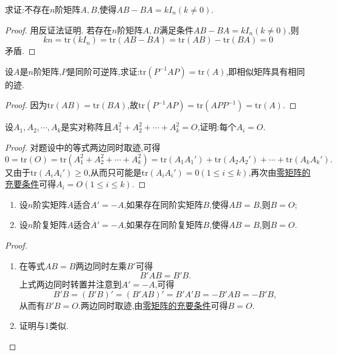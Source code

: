 \documentclass[../../main.tex]{subfiles}
\begin{document}
\begin{example}
求证:不存在\(n\)阶矩阵\(A,B\),使得\(AB - BA = kI_n(k\neq0)\).
\end{example}
\begin{proof}
用反证法证明. 若存在\(n\)阶矩阵\(A,B\)满足条件\(AB - BA = kI_n(k\neq0)\),则
\[
kn=\mathrm{tr}(kI_n)=\mathrm{tr}(AB - BA)=\mathrm{tr}(AB)-\mathrm{tr}(BA)=0
\]
矛盾.
\end{proof}

\begin{proposition}
设\(A\)是\(n\)阶矩阵,\(P\)是同阶可逆阵,求证:\(\mathrm{tr}(P^{-1}AP)=\mathrm{tr}(A)\),即相似矩阵具有相同的迹.
\end{proposition}
\begin{proof}
因为\(\mathrm{tr}(AB)=\mathrm{tr}(BA)\),故\(\mathrm{tr}(P^{-1}AP)=\mathrm{tr}(APP^{-1})=\mathrm{tr}(A)\).
\end{proof}

\begin{example}
设\(A_1,A_2,\cdots,A_k\)是实对称阵且\(A_1^2 + A_2^2+\cdots+A_k^2 = O\),证明:每个\(A_i = O\).
\end{example}
\begin{proof}
对题设中的等式两边同时取迹,可得
\[
0=\mathrm{tr}(O)=\mathrm{tr}(A_1^2 + A_2^2+\cdots+A_k^2)=\mathrm{tr}(A_1A_1')+\mathrm{tr}(A_2A_2')+\cdots+\mathrm{tr}(A_kA_k').
\]
又由于\(\mathrm{tr}(A_iA_i')\geqslant 0\),从而只可能是\(\mathrm{tr}(A_iA_i') = 0(1\leqslant  i\leqslant  k)\),再次由\hyperref[proposition:零矩阵的充要条件]{零矩阵的充要条件}可得\(A_i = O(1\leqslant  i\leqslant  k)\).
\end{proof}

\begin{proposition}\label{proposition:反称/反酉矩阵为零矩阵的充要条件}
\begin{enumerate}
\item 设\(n\)阶实矩阵\(A\)适合\(A'=-A\),如果存在同阶实矩阵\(B\),使得\(AB = B\),则\(B = O\);
\item 设\(n\)阶复矩阵\(A\)适合\(\overline{A}'=-A\),如果存在同阶复矩阵\(B\),使得\(AB = B\),则\(B = O\).
\end{enumerate}
\end{proposition}
\begin{proof}
\begin{enumerate}
\item 在等式\(AB = B\)两边同时左乘\(B'\)可得
\[
B'AB = B'B.
\]
上式两边同时转置并注意到\(A'=-A\),可得
\[
B'B=(B'B)'=(B'AB)'=B'A'B=-B'AB=-B'B,
\]
从而有\(B'B = O\).两边同时取迹,由\hyperref[proposition:零矩阵的充要条件]{零矩阵的充要条件}可得\(B = O\).
\item 证明与1类似.
\end{enumerate}
\end{proof}
\end{document}
